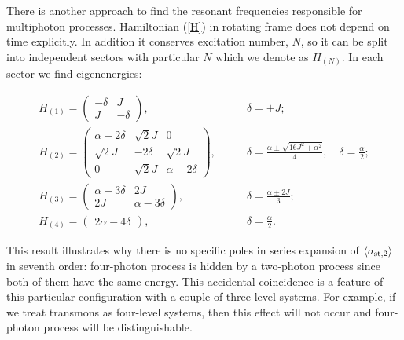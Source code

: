 \documentclass[%
 aps, pra,
 amsmath,amssymb,
 reprint,%
superscriptaddress
]{revtex4-2}
\begin{document}
There is another approach to find the resonant frequencies responsible for multiphoton processes. Hamiltonian (\ref{H}) in rotating frame does not depend on time explicitly. In addition it conserves excitation number, $N$, so it can be split into independent sectors with particular $N$ which we denote as $H_{(N)}$.
In each sector we find eigenenergies:
\begin{widetext}
$$
\begin{array}{ccc}
H_{(1)} = \begin{pmatrix}
-\delta & J
\\
J & -\delta
\end{pmatrix},
\qquad &
\delta = \pm J;
\\[1em]
H_{(2)} = \begin{pmatrix}
\alpha - 2\delta & \sqrt{2} J & 0
\\
\sqrt{2} J & - 2\delta & \sqrt{2} J
\\
0 & \sqrt{2} J & \alpha - 2 \delta
\end{pmatrix},
\qquad &
\displaystyle
\delta = \frac{\alpha \pm \sqrt{16 J^2 + \alpha^2}}{4}, \quad \delta = \frac{\alpha}{2};
\\[2em]
H_{(3)} = \begin{pmatrix}
\alpha - 3\delta & 2J
\\
2 J & \alpha - 3 \delta
\end{pmatrix},
\qquad & \displaystyle
\delta = \frac{\alpha \pm 2 J}{3};
\\[2em]
H_{(4)} = \begin{pmatrix}
2 \alpha - 4\delta
\end{pmatrix},
\qquad & \displaystyle
\delta = \frac{\alpha}{2}.
\end{array}
$$
\end{widetext}
This result illustrates why there is no specific poles in series expansion of $\langle\sigma_{{\rm st},2}\rangle$ in seventh order: four-photon process is hidden by a two-photon process since both of them have the same energy. This accidental coincidence is a feature of this particular configuration with a couple of three-level systems. For example, if we treat transmons as  four-level systems, then this effect will not occur and four-photon process will be distinguishable.






\end{document}

